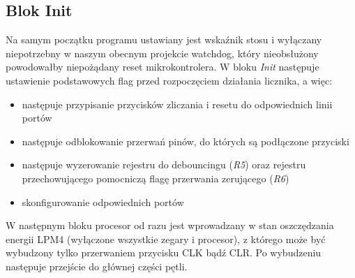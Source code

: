\documentclass[fleqn]{article}
\begin{document}
\subsection{Blok Init}
		Na samym początku programu ustawiany jest wskaźnik stosu i wyłączany niepotrzebny w naszym obecnym projekcie watchdog, który nieobsłużony powodowałby niepożądany reset mikrokontrolera.
		W bloku \textit{Init} następuje ustawienie podstawowych flag przed rozpoczęciem działania licznika, a więc:
		\begin{itemize}
			\item następuje przypisanie przycisków zliczania i resetu do odpowiednich linii portów
			\item następuje odblokowanie przerwań pinów, do których są podłączone przyciski
			\item następuje wyzerowanie rejestru do debouncingu (\textit{R5}) oraz rejestru przechowującego pomocniczą flagę przerwania zerującego (\textit{R6})
			\item skonfigurowanie odpowiednich portów
		\end{itemize}

		W następnym bloku procesor od razu jest wprowadzany w stan oszczędzania energii LPM4 (wyłączone wszystkie zegary i procesor), z którego może być wybudzony tylko przerwaniem przycisku CLK bądź CLR. Po wybudzeniu następuje przejście do głównej części pętli.
\end{document}
